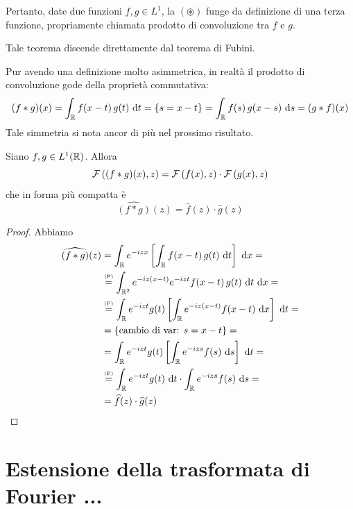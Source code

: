Pertanto, date due funzioni $f,g\in L^1$, la $(\circledast)$ funge da definizione di una terza funzione, propriamente chiamata prodotto di convoluzione tra $f$ e $g$.

\begin{rem}
Tale teorema discende direttamente dal teorema di Fubini.
\end{rem}

\begin{rem}
Pur avendo una definizione molto asimmetrica, in realtà il prodotto di convoluzione gode della proprietà commutativa:
\begin{equation*}
(f*g)(x)=\int_{\mathbb{R}} f(x-t)\,g(t)\  \mathrm{d} t=\left\{s=x-t\right\}=\int_{\mathbb{R}} f(s)\,g(x-s)\  \mathrm{d} s=(g*f)(x)
\end{equation*}
Tale simmetria si nota ancor di più nel prossimo risultato.
\end{rem}

\begin{thm}
Siano $f,g\in L^1(\mathbb{R})$. Allora
\begin{equation*}
\mathcal{F}\left((f*g)(x),z\right)=\mathcal{F}\left(f(x),z\right)\cdot\mathcal{F}\left(g(x),z\right)
\end{equation*}
che in forma più compatta è
\begin{equation*}
\hat{(f*g)}(z)=\hat{f}(z)\cdot\hat{g}(z)
\end{equation*}
\end{thm}

\begin{proof}
Abbiamo
\begin{align*}
\widehat{(f*g)}(z)&=\int_{\mathbb{R}} e^{-izx}\left[\int_{\mathbb{R}} f(x-t)\,g(t)\  \mathrm{d} t\right]\  \mathrm{d} x=\\
&\overset{\underset{\mathrm{(F)}}{}}{=}\int_{\mathbb{R}^2}e^{-iz(x-t)}e^{-izt}f(x-t)\,g(t)\  \mathrm{d} t\  \mathrm{d} x =\\
&\overset{\underset{\mathrm{(F)}}{}}{=}\int_{\mathbb{R}} e^{-izt}g(t)\left[\int_{\mathbb{R}} e^{-iz(x-t)} f(x-t)\  \mathrm{d} x\right]\  \mathrm{d} t=\\
&=\left\{\text{cambio di var: }s=x-t\right\}=\\
&=\int_{\mathbb{R}} e^{-izt}g(t)\left[\int_{\mathbb{R}} e^{-izs} f(s)\  \mathrm{d} s\right]\  \mathrm{d} t=\\
&\overset{\underset{\mathrm{(F)}}{}}{=}\int_{\mathbb{R}} e^{-izt}g(t)\  \mathrm{d} t\cdot \int_{\mathbb{R}} e^{-izs} f(s)\  \mathrm{d} s =\\
&= \widehat{f}(z)\cdot\widehat{g}(z)
\end{align*}
\end{proof}


\section{Estensione della trasformata di Fourier ... }


